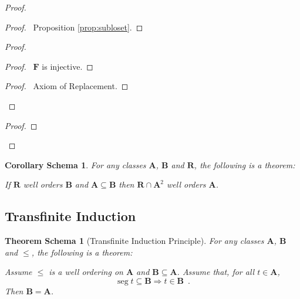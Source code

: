 \documentclass{book}
\let\qed\relax
\newtheorem{cors}{Corollary Schema}[ax]
\newtheorem{thms}[ax]{Theorem Schema}
\theoremstyle{definition}
\newcommand{\seg}{\ensuremath{\operatorname{seg}}}
\begin{document}
\begin{proof}
\pf
{}
\begin{proof}
	\pf\ Proposition \ref{prop:subloset}.
\end{proof}
\begin{proof}
	\begin{proof}
		\pf\ $\mathbf{F}$ is injective.
	\end{proof}
	\begin{proof}
		\pf\ Axiom of Replacement.
	\end{proof}
\end{proof}
\begin{proof}
\end{proof}
\qed
\end{proof}

\begin{cors}
\label{cor:subwoset}
For any classes $\mathbf{A}$, $\mathbf{B}$ and $\mathbf{R}$, the following is a theorem:

If $\mathbf{R}$ well orders $\mathbf{B}$ and $\mathbf{A} \subseteq \mathbf{B}$ then $\mathbf{R} \cap \mathbf{A}^2$ well orders $\mathbf{A}$.
\end{cors}

\subsection{Transfinite Induction}

\begin{thms}[Transfinite Induction Principle]
For any classes $\mathbf{A}$, $\mathbf{B}$ and $\leq$, the following is a theorem:

Assume $\leq$ is a well ordering on $\mathbf{A}$ and $\mathbf{B} \subseteq \mathbf{A}$. Assume that, for all $t \in \mathbf{A}$,
\[ \seg t \subseteq \mathbf{B} \Rightarrow t \in \mathbf{B} \enspace . \]
Then $\mathbf{B} = \mathbf{A}$.
\end{thms}
\end{document}
